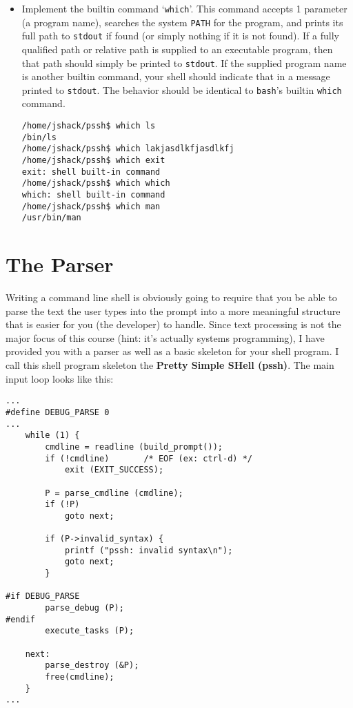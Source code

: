 \documentclass[10pt]{article}
\begin{document}
\begin{itemize}
    \item Implement the builtin command `\texttt{which}'. This command
        accepts 1 parameter (a program name), searches the system
        \texttt{PATH} for the program, and prints its full path to
        \texttt{stdout} if found (or simply nothing if it is not found).
        If a fully qualified path or relative path is supplied to an
        executable program, then that path should simply be printed to
        \texttt{stdout}.  If the supplied program name is another
        builtin command, your shell should indicate that in a message
        printed to \texttt{stdout}. The behavior should be identical to
        \texttt{bash}'s builtin \texttt{which} command.

\begin{verbatim}
/home/jshack/pssh$ which ls
/bin/ls
/home/jshack/pssh$ which lakjasdlkfjasdlkfj
/home/jshack/pssh$ which exit
exit: shell built-in command
/home/jshack/pssh$ which which
which: shell built-in command
/home/jshack/pssh$ which man
/usr/bin/man
\end{verbatim}

\end{itemize}


\section{The Parser}

Writing a command line shell is obviously going to require that you be
able to parse the text the user types into the prompt into a more
meaningful structure that is easier for you (the developer) to handle.
Since text processing is not the major focus of this course (hint: it's
actually systems programming), I have provided you with a parser as well
as a basic skeleton for your shell program.  I call this shell program
skeleton the \textbf{Pretty Simple SHell (pssh)}.  The main input loop
looks like this:

\begin{verbatim}
...
#define DEBUG_PARSE 0
...
    while (1) {
        cmdline = readline (build_prompt());
        if (!cmdline)       /* EOF (ex: ctrl-d) */
            exit (EXIT_SUCCESS);

        P = parse_cmdline (cmdline);
        if (!P)
            goto next;

        if (P->invalid_syntax) {
            printf ("pssh: invalid syntax\n");
            goto next;
        }

#if DEBUG_PARSE
        parse_debug (P);
#endif
        execute_tasks (P);

    next:
        parse_destroy (&P);
        free(cmdline);
    }
...
\end{verbatim}
\end{document}
